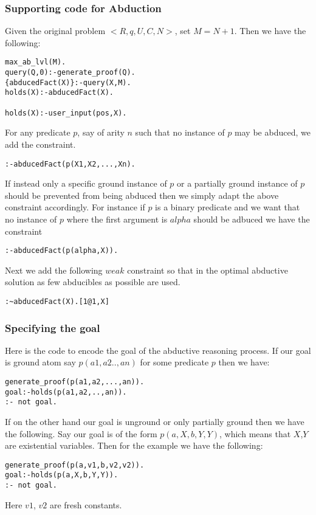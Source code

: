 \documentclass[sigconf]{acmart}
\begin{document}
\subsubsection{Supporting code for Abduction} 
Given the original problem $<R,q,U,C,N>$, set $M=N+1$. Then we have the following: 
\begin{verbatim}
max_ab_lvl(M).
query(Q,0):-generate_proof(Q).
{abducedFact(X)}:-query(X,M).
holds(X):-abducedFact(X).

holds(X):-user_input(pos,X).
\end{verbatim}
For any predicate $p$, say of arity $n$ such that no instance of $p$ may be abduced, we add the constraint.
\begin{verbatim} 
:-abducedFact(p(X1,X2,...,Xn).
\end{verbatim}
If instead only a specific ground instance of $p$ or a partially ground instance of $p$ should be prevented from being abduced then we simply adapt the above constraint accordingly. For instance if $p$ is a binary predicate and we want that no instance of $p$ where the first argument is $alpha$ should be adbuced we have the constraint
\begin{verbatim} 
:-abducedFact(p(alpha,X)).
\end{verbatim}
Next we add the following $weak$ constraint so that in the optimal abductive solution as few abducibles as possible are used.
\begin{verbatim} 
:~abducedFact(X).[1@1,X]
\end{verbatim}
\subsubsection{Specifying the goal}
Here is the code to encode the goal of the abductive reasoning process. If our goal is ground atom say $p(a1,a2..,an)$ for some predicate $p$ then we have:
\begin{verbatim}
generate_proof(p(a1,a2,...,an)).
goal:-holds(p(a1,a2,..,an)).
:- not goal.
\end{verbatim}
If on the other hand our goal is unground or only partially ground then we have the following. Say our goal is of the form $p(a,X,b,Y,Y)$, which means that $X$,$Y$ are existential variables. Then for the example we have the following:
\begin{verbatim}
generate_proof(p(a,v1,b,v2,v2)).
goal:-holds(p(a,X,b,Y,Y)).
:- not goal.
\end{verbatim}
Here $v1$, $v2$ are fresh constants.
\end{document}
